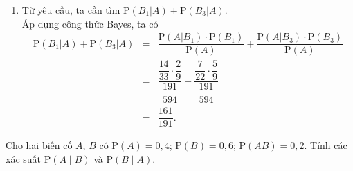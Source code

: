 \begin{bt}[CD, Mức độ 3]
{\begin{enumerate}
\begin{eqnarray*}
			\end{eqnarray*}
			\item Từ yêu cầu, ta cần tìm $\mathrm{P}(B_1|A) + \mathrm{P}(B_3|A)$.\\
			Áp dụng công thức Bayes, ta có
			\allowdisplaybreaks
			\begin{eqnarray*}
				\mathrm{P}(B_1|A) + \mathrm{P}(B_3|A) 
				&=& \dfrac{\mathrm{P}(A|B_1)\cdot \mathrm{P}(B_1)}{\mathrm{P}(A)} + \dfrac{\mathrm{P}(A|B_3)\cdot \mathrm{P}(B_3)}{\mathrm{P}(A)}\\
				&=& \dfrac{\dfrac{14}{33}\cdot \dfrac{2}{9}}{\dfrac{191}{594}} + \dfrac{\dfrac{7}{22}\cdot \dfrac{5}{9}}{\dfrac{191}{594}}\\
				&=& \dfrac{161}{191}.
			\end{eqnarray*}
		\end{enumerate}
	}
\end{bt}

\begin{vd}[CD, Mức độ 1]%
	Cho hai biến cố $A$, $B$ có $\mathrm{P}(A)=0,4$; $\mathrm{P}(B)=0,6$; $\mathrm{P}(AB)=0,2$. Tính các xác suất $\mathrm{P}(A\mid B)$ và $\mathrm{P}(B\mid A)$.
\end{vd}

